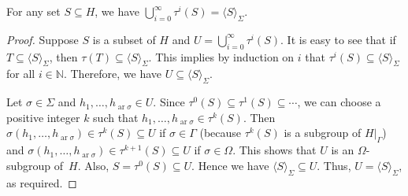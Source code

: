 \documentclass{jgcc}
\DeclareMathOperator{\ar}{ar}
\newcommand{\Add}[1]{#1|_\Gamma}
\newcommand{\alg}[1]{\langle#1\rangle}
\newcommand{\N}{\mathbb N}
\begin{document}
\begin{lem}
\label{l:uniontauiSeqalgSSigma}
For any set $S\subseteq H$, we have
$\bigcup_{i=0}^\infty\tau^i(S)=\alg S_\Sigma$.
\end{lem}
\begin{proof}
Suppose $S$ is a subset of $H$ and
$U=\bigcup_{i=0}^\infty\tau^i(S)$. It is easy to see that if
$T\subseteq\alg S_\Sigma$, then $\tau(T)\subseteq\alg
S_\Sigma$. This implies by induction on $i$ that
$\tau^i(S)\subseteq\alg S_\Sigma$ for all $i\in\N$.
Therefore, we have $U\subseteq\alg S_\Sigma$.

Let $\sigma\in\Sigma$ and $h_1,\dots,h_{\ar\sigma}\in U$.
Since $\tau^0(S)\subseteq\tau^1(S)\subseteq\dotsb$, we can
choose a positive integer $k$ such that
$h_1,\dots,h_{\ar\sigma}\in\tau^k(S)$. Then
$\sigma(h_1,\dots,h_{\ar\sigma})\in\tau^k(S)\subseteq U$ if
$\sigma\in\Gamma$ (because $\tau^k(S)$ is a subgroup of
$\Add H$) and
$\sigma(h_1,\dots,h_{\ar\sigma})\in\tau^{k+1}(S)\subseteq U$
if $\sigma\in\Omega$. This shows that $U$ is an
$\Omega$-subgroup of~$H$. Also, $S=\tau^0(S)\subseteq U$.
Hence we have $\alg S_\Sigma\subseteq U$. Thus, $U=\alg
S_\Sigma$, as required.
\end{proof}
\end{document}

